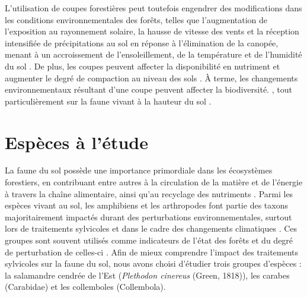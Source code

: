 L'utilisation de coupes forestières peut toutefois engendrer des modifications dans les conditions environnementales des forêts, 
telles que l'augmentation de l'exposition au rayonnement solaire, la hausse de vitesse des vents et la réception intensifiée de précipitations au sol en réponse à l'élimination de la canopée, 
menant à un accroissement de l'ensoleillement, de la température et de l'humidité du sol \citep{Keenan1993ecologicaleffects,Lindo2003Microbialbiomass,Heithecker2007Edgerelatedgradients}.
De plus, les coupes peuvent affecter la disponibilité en nutriment et augmenter le degré de compaction au niveau des sols \citep{Covington1981Changesforest,Lindo2003Microbialbiomass,Battigelli2004Shorttermimpact,rousseauLongtermEffectsBiomass2018}. 
À terme, les changements environnementaux résultant d'une coupe peuvent affecter la biodiversité. \citep{Paillet2010Biodiversitydifferences,Fedrowitz2014Canretention,Chaudhary2016Impactforest}, 
tout particulièrement sur la faune vivant à la hauteur du sol \citep{Lindo2003Microbialbiomass,Chaudhary2016Impactforest,Kudrin2023metaanalysiseffects}.

\section*{Espèces à l'étude}
\label{sec:species}

La faune du sol possède une importance primordiale dans les écosystèmes forestiers, en contribuant entre autres à la circulation de la matière et de l'énergie à travers la chaîne alimentaire, ainsi qu'au recyclage des nutriments \citep{Seibold2021contributioninsects,Kudrin2023metaanalysiseffects}.
Parmi les espèces vivant au sol, les amphibiens et les arthropodes font partie des taxons majoritairement impactés durant des perturbations environnementales, 
surtout lors de traitements sylvicoles \citep{Stuart2004Statustrends,Semlitsch2009Effectstimber,Hartshorn2021reviewforest} et dans le cadre des changements climatiques \citep{Alford1999Globalamphibian,Houlahan2000Quantitativeevidence,Pounds2006Widespreadamphibian,Warren2018projectedeffect}. 
Ces groupes sont souvent utilisés comme indicateurs de l'état des forêts et du degré de perturbation de celles-ci \citep{pongeVerticalDistributionCollembola2000,birdChangesSoilLitter2004,Maleque2009Arthropodsbioindicators}.
Afin de mieux comprendre l'impact des traitements sylvicoles sur la faune du sol, nous avons choisi d'étudier trois groupes d'espèces : la salamandre cendrée de l'Est (\textit{Plethodon cinereus} (Green, 1818)), 
les carabes (Carabidae) et les collemboles (Collembola).

